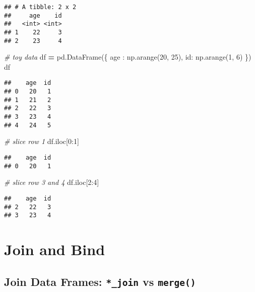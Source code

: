 \documentclass[
]{book}
\newenvironment{Shaded}{\begin{snugshade}}{\end{snugshade}}
\newcommand{\CommentTok}[1]{\textcolor[rgb]{0.56,0.35,0.01}{\textit{#1}}}
\newcommand{\DecValTok}[1]{\textcolor[rgb]{0.00,0.00,0.81}{#1}}
\newcommand{\NormalTok}[1]{#1}
\newcommand{\OperatorTok}[1]{\textcolor[rgb]{0.81,0.36,0.00}{\textbf{#1}}}
\newcommand{\StringTok}[1]{\textcolor[rgb]{0.31,0.60,0.02}{#1}}
\begin{document}
\begin{verbatim}
## # A tibble: 2 x 2
##     age    id
##   <int> <int>
## 1    22     3
## 2    23     4
\end{verbatim}

\begin{Shaded}
\begin{Highlighting}[]
\CommentTok{\# toy data}
\NormalTok{df }\OperatorTok{=}\NormalTok{ pd.DataFrame(\{}
    \StringTok{\textquotesingle{}age\textquotesingle{}}\NormalTok{ : np.arange(}\DecValTok{20}\NormalTok{, }\DecValTok{25}\NormalTok{),}
    \StringTok{\textquotesingle{}id\textquotesingle{}}\NormalTok{: np.arange(}\DecValTok{1}\NormalTok{, }\DecValTok{6}\NormalTok{)}
\NormalTok{\})}
\NormalTok{df}
\end{Highlighting}
\end{Shaded}

\begin{verbatim}
##    age  id
## 0   20   1
## 1   21   2
## 2   22   3
## 3   23   4
## 4   24   5
\end{verbatim}

\begin{Shaded}
\begin{Highlighting}[]
\CommentTok{\# slice row 1}
\NormalTok{df.iloc[}\DecValTok{0}\NormalTok{:}\DecValTok{1}\NormalTok{]}
\end{Highlighting}
\end{Shaded}

\begin{verbatim}
##    age  id
## 0   20   1
\end{verbatim}

\begin{Shaded}
\begin{Highlighting}[]
\CommentTok{\# slice row 3 and 4}
\NormalTok{df.iloc[}\DecValTok{2}\NormalTok{:}\DecValTok{4}\NormalTok{]}
\end{Highlighting}
\end{Shaded}

\begin{verbatim}
##    age  id
## 2   22   3
## 3   23   4
\end{verbatim}

\hypertarget{join-and-bind}{%
\chapter{Join and Bind}\label{join-and-bind}}

\hypertarget{join-data-frames-_join-vs-merge}{%
\section{\texorpdfstring{Join Data Frames: \texttt{*\_join} vs \texttt{merge()}}{Join Data Frames: *\_join vs merge()}}\label{join-data-frames-_join-vs-merge}}
\end{document}
